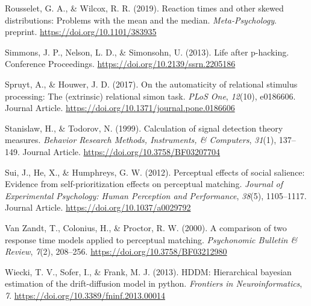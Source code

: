 \documentclass[
  english,
  man]{apa6}
\begin{document}
\leavevmode\hypertarget{ref-Rousselet_2019}{}%
Rousselet, G. A., \& Wilcox, R. R. (2019). Reaction times and other skewed distributions: Problems with the mean and the median. \emph{Meta-Psychology}. preprint. \url{https://doi.org/10.1101/383935}

\leavevmode\hypertarget{ref-Simmons_2013_life}{}%
Simmons, J. P., Nelson, L. D., \& Simonsohn, U. (2013). Life after p-hacking. Conference Proceedings. \url{https://doi.org/10.2139/ssrn.2205186}

\leavevmode\hypertarget{ref-Spruyt_de_Houwer_2017}{}%
Spruyt, A., \& Houwer, J. D. (2017). On the automaticity of relational stimulus processing: The (extrinsic) relational simon task. \emph{PLoS One}, \emph{12}(10), e0186606. Journal Article. \url{https://doi.org/10.1371/journal.pone.0186606}

\leavevmode\hypertarget{ref-Stanislaw_Todorov_1999}{}%
Stanislaw, H., \& Todorov, N. (1999). Calculation of signal detection theory measures. \emph{Behavior Research Methods, Instruments, \& Computers}, \emph{31}(1), 137--149. Journal Article. \url{https://doi.org/10.3758/BF03207704}

\leavevmode\hypertarget{ref-Sui_2012_JEPHPP}{}%
Sui, J., He, X., \& Humphreys, G. W. (2012). Perceptual effects of social salience: Evidence from self-prioritization effects on perceptual matching. \emph{Journal of Experimental Psychology: Human Perception and Performance}, \emph{38}(5), 1105--1117. Journal Article. \url{https://doi.org/10.1037/a0029792}

\leavevmode\hypertarget{ref-van_zandt_comparison_2000}{}%
Van Zandt, T., Colonius, H., \& Proctor, R. W. (2000). A comparison of two response time models applied to perceptual matching. \emph{Psychonomic Bulletin \& Review}, \emph{7}(2), 208--256. \url{https://doi.org/10.3758/BF03212980}

\leavevmode\hypertarget{ref-wiecki_hddm_2013}{}%
Wiecki, T. V., Sofer, I., \& Frank, M. J. (2013). HDDM: Hierarchical bayesian estimation of the drift-diffusion model in python. \emph{Frontiers in Neuroinformatics}, \emph{7}. \url{https://doi.org/10.3389/fninf.2013.00014}

\endgroup
\end{document}
